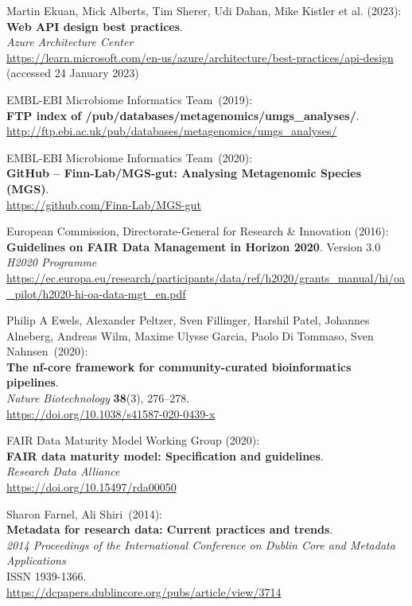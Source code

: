 \begin{thebibliography}{9}
Martin Ekuan, Mick Alberts, Tim Sherer, Udi Dahan, Mike Kistler et
al. (2023):\\
\textbf{Web {API} design best practices}.\\
\emph{Azure Architecture Center}\\
\url{https://learn.microsoft.com/en-us/azure/architecture/best-practices/api-design}
(accessed 24 January 2023)

EMBL-EBI Microbiome Informatics Team~(2019):\\
\textbf{FTP index of /pub/databases/metagenomics/umgs\_analyses/}.\\
\url{http://ftp.ebi.ac.uk/pub/databases/metagenomics/umgs_analyses/}

EMBL-EBI Microbiome Informatics Team~(2020):\\
\textbf{GitHub -- Finn-Lab/MGS-gut: Analysing Metagenomic Species (MGS)}.\\
\url{https://github.com/Finn-Lab/MGS-gut}

European Commission, Directorate-General for Research \& Innovation (2016):\\
\textbf{Guidelines on FAIR Data Management in Horizon 2020}. Version 3.0\\
\emph{H2020 Programme}\\
\url{https://ec.europa.eu/research/participants/data/ref/h2020/grants_manual/hi/oa_pilot/h2020-hi-oa-data-mgt_en.pdf}

Philip A Ewels, Alexander Peltzer, Sven Fillinger, Harshil
Patel, Johannes Alneberg, Andreas Wilm, Maxime Ulysse Garcia, Paolo Di
Tommaso, Sven Nahnsen~(2020):\\
\textbf{The nf-core framework for community-curated bioinformatics
pipelines}.\\
\emph{Nature Biotechnology} \textbf{38}(3), 276--278.\\
\url{https://doi.org/10.1038/s41587-020-0439-x}

FAIR Data Maturity Model Working Group (2020): \\
\textbf{FAIR data maturity model: Specification and guidelines}.\\
\emph{Research Data Alliance}\\
\url{https://doi.org/10.15497/rda00050}

Sharon Farnel, Ali Shiri~(2014):\\
\textbf{Metadata for research data: Current practices and trends}.\\
\emph{2014 Proceedings of the International Conference on Dublin Core
and Metadata Applications}\\
ISSN 1939-1366.\\
\url{https://dcpapers.dublincore.org/pubs/article/view/3714}


\end{thebibliography}
